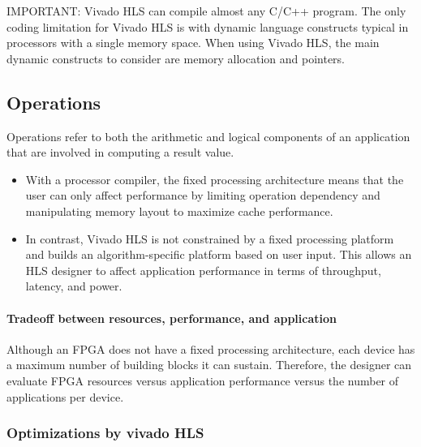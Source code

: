   
  \begin{highlight}
    IMPORTANT: Vivado HLS can compile almost any C/C++ program. The only coding limitation for Vivado HLS is with dynamic language constructs typical in processors with a single memory space. When using Vivado HLS, the main dynamic constructs to consider are memory allocation and pointers.
  \end{highlight}

                                                    
\subsection{Operations}
Operations refer to both the arithmetic and logical components of an application that are involved in computing a result value. 
\begin{itemize}
  \item With a processor compiler, the fixed processing architecture means that the user can only affect performance by limiting operation dependency and manipulating memory layout to maximize cache performance.
  \item In contrast, Vivado HLS is not constrained by a fixed processing platform and builds an algorithm-specific platform based on user input. This allows an HLS designer to affect application performance in terms of throughput, latency, and power.
\end{itemize} 

\paragraph{Tradeoff between resources, performance, and application}
Although an FPGA does not have a fixed processing architecture, each
device has a maximum number of building blocks it can sustain. Therefore, the designer can evaluate FPGA resources versus application performance versus the number of applications per device.

\subsubsection{Optimizations by vivado HLS}

